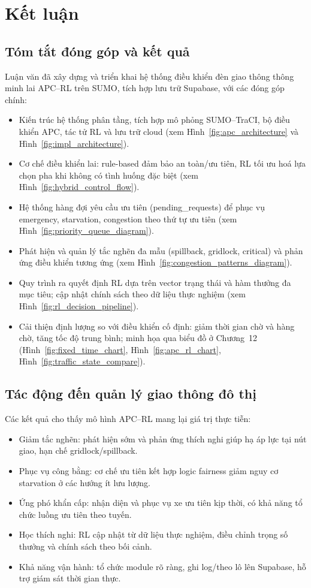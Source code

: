 \chapter{Kết luận}

\section{Tóm tắt đóng góp và kết quả}
Luận văn đã xây dựng và triển khai hệ thống điều khiển đèn giao thông thông minh lai APC–RL trên SUMO, tích hợp lưu trữ Supabase, với các đóng góp chính:
\begin{itemize}
    \item Kiến trúc hệ thống phân tầng, tích hợp mô phỏng SUMO–TraCI, bộ điều khiển APC, tác tử RL và lưu trữ cloud (xem Hình~\ref{fig:apc_architecture} và Hình~\ref{fig:impl_architecture}).
    \item Cơ chế điều khiển lai: rule-based đảm bảo an toàn/ưu tiên, RL tối ưu hoá lựa chọn pha khi không có tình huống đặc biệt (xem Hình~\ref{fig:hybrid_control_flow}).
    \item Hệ thống hàng đợi yêu cầu ưu tiên (pending\_requests) để phục vụ emergency, starvation, congestion theo thứ tự ưu tiên (xem Hình~\ref{fig:priority_queue_diagram}).
    \item Phát hiện và quản lý tắc nghẽn đa mẫu (spillback, gridlock, critical) và phản ứng điều khiển tương ứng (xem Hình~\ref{fig:congestion_patterns_diagram}).
    \item Quy trình ra quyết định RL dựa trên vector trạng thái và hàm thưởng đa mục tiêu; cập nhật chính sách theo dữ liệu thực nghiệm (xem Hình~\ref{fig:rl_decision_pipeline}).
    \item Cải thiện định lượng so với điều khiển cố định: giảm thời gian chờ và hàng chờ, tăng tốc độ trung bình; minh họa qua biểu đồ ở Chương~12 (Hình~\ref{fig:fixed_time_chart}, Hình~\ref{fig:apc_rl_chart}, Hình~\ref{fig:traffic_state_compare}).
\end{itemize}

\section{Tác động đến quản lý giao thông đô thị}
Các kết quả cho thấy mô hình APC–RL mang lại giá trị thực tiễn:
\begin{itemize}
    \item Giảm tắc nghẽn: phát hiện sớm và phản ứng thích nghi giúp hạ áp lực tại nút giao, hạn chế gridlock/spillback.
    \item Phục vụ công bằng: cơ chế ưu tiên kết hợp logic fairness giảm nguy cơ starvation ở các hướng ít lưu lượng.
    \item Ứng phó khẩn cấp: nhận diện và phục vụ xe ưu tiên kịp thời, có khả năng tổ chức luồng ưu tiên theo tuyến.
    \item Học thích nghi: RL cập nhật từ dữ liệu thực nghiệm, điều chỉnh trọng số thưởng và chính sách theo bối cảnh.
    \item Khả năng vận hành: tổ chức module rõ ràng, ghi log/theo lô lên Supabase, hỗ trợ giám sát thời gian thực.
\end{itemize}


